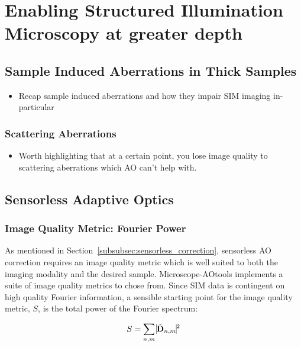 \chapter{Enabling Structured Illumination Microscopy at greater depth}

\section{Sample Induced Aberrations in Thick Samples}
\label{sec:sample_aberrations_thick}

\begin{itemize}
	\item Recap sample induced aberrations and how they impair SIM imaging in-particular
\end{itemize}

	\subsection{Scattering Aberrations}
	\label{subsec:scattering}
	
	\begin{itemize}
		\item Worth highlighting that at a certain point, you lose image quality to scattering aberrations which AO can't help with.
	\end{itemize}

\section{Sensorless Adaptive Optics}
\label{sec:sensorless_AO}

	\subsection{Image Quality Metric: Fourier Power}
	\label{subsec:fourier_power_metric}
	
	As mentioned in Section~\ref{subsubsec:sensorless_correction}, 
	sensorless AO correction requires an image quality metric which
	is well suited to both the imaging modality and the desired 
	sample. Microscope-AOtools implements a suite of image quality
	metrics to chose from. Since SIM data is contingent on high
	quality Fourier information, a sensible starting point for 
	the image quality metric, $S$, is the total power of the Fourier
	spectrum:
	
	\begin{equation}\label{eq:fourier_power_spectrum}
		S = \sum\limits_{n,m}{\vline \tilde{\textbf{D}}_{n,m} \vline^2}
	\end{equation}
	
